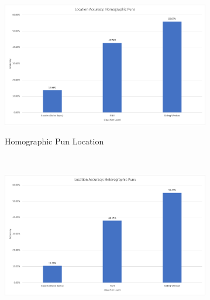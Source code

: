 \documentclass[final]{beamer}
\newlength{\onecolwid}
\newlength{\twocolwid}
\begin{document}
\begin{frame}[t]
\begin{columns}[t]
\begin{column}{\twocolwid}
			\begin{columns}[t,totalwidth=\twocolwid]
				\begin{column}{15mm}\end{column}
				\begin{column}{\onecolwid}

					\vspace{25mm}
					\begin{figure}
					\includegraphics[width=0.85\textwidth]{HomographicLocation.png}\\
					\caption{\hspace{50mm}Homographic Pun Location}
					\end{figure}
					\\
					\vspace{20mm}
					\begin{figure}
					\includegraphics[width=0.85\textwidth]{HeterographicLocation.png}\\

\end{figure}
\end{column}
\end{columns}
\end{column}
\end{columns}
\end{frame}
\end{document}
